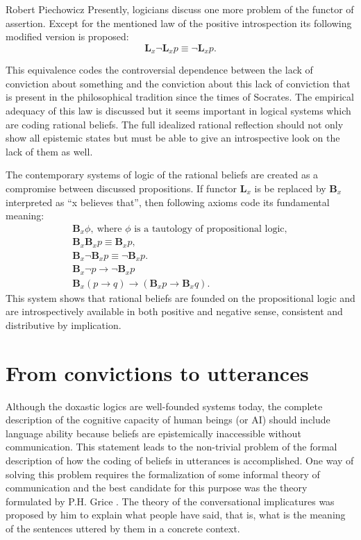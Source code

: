 \begin{artengenv}{Robert Piechowicz}
Presently, logicians discuss one more problem of the functor of assertion. Except for the mentioned law of the positive introspection its following modified version is proposed:
$$\mathbf{L}_{x}\neg \mathbf{L}_{x} p\equiv \neg \mathbf{ L}_{x}p.$$

This equivalence codes the controversial dependence between the lack of conviction about something and the conviction about this lack of conviction that is present in the philosophical tradition since the times of Socrates. The empirical adequacy of this law is discussed but it seems important in logical systems which are coding rational beliefs. The full idealized rational reflection should not only show all epistemic states but must be able to give an introspective look on the lack of them as well.

The contemporary systems of logic of the rational beliefs are created as a compromise between discussed propositions. If functor $\mathbf{L}_{x}$  is be replaced by $\mathbf{B}_{x}$ interpreted as ``x believes that'', then following axioms code its fundamental meaning:
\begin{gather}
\mathbf{B}_{x}\phi,\tag*{1.}\ 
\text{where $\phi$ is a tautology of propositional logic},\\
\mathbf{B}_{x}\mathbf{B}_{x} p\equiv\mathbf{ B}_{x}p,\tag*{2.}\\
\mathbf{B}_{x}\neg\mathbf{B}_{x} p\equiv\neg \mathbf{ B}_{x}p.\tag*{3.}\\
\mathbf{B}_{x}\neg p\rightarrow \neg \mathbf{B}_{x} p \tag*{4.}\\
\mathbf{B}_{x}(p\rightarrow q)\rightarrow (\mathbf{B}_{x}p\rightarrow \mathbf{B}_{x}q).\tag*{5.}
\end{gather}
This system shows that rational beliefs are founded on the propositional logic and are introspectively available in both positive and negative sense, consistent and distributive by implication.

\section{From convictions to utterances}

\indent Although the doxastic logics are well-founded systems today, the complete description of the cognitive capacity of human beings (or AI) should include language ability because beliefs are epistemically inaccessible without communication. This statement leads to the non-trivial problem of the formal description of how the coding of beliefs in utterances is accomplished. One way of solving this problem requires the formalization of some informal theory of communication and the best candidate for this purpose was the theory formulated by P.H. Grice
\parencite*[p.22-40]{grice_studies_1989}.
The theory of the conversational implicatures was proposed by him to explain what people have said, that is, what is the meaning of the sentences uttered by them in a concrete context.


\end{artengenv}
